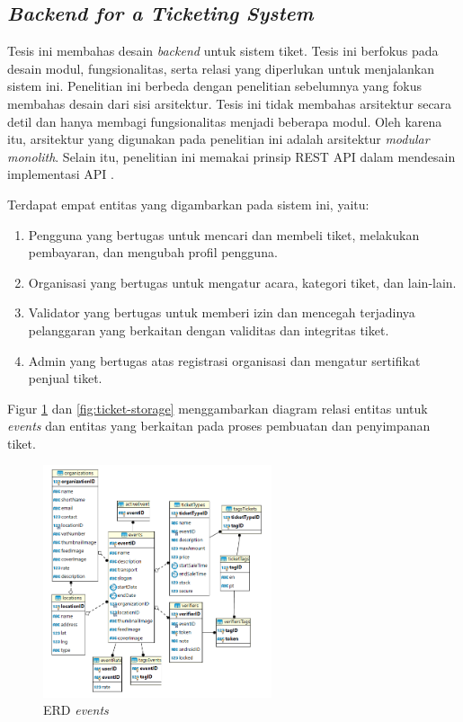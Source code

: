 \subsection{\textit{Backend for a Ticketing System}}

Tesis ini membahas desain \textit{backend} untuk sistem tiket. Tesis ini berfokus pada desain modul, fungsionalitas, serta relasi yang diperlukan untuk menjalankan sistem ini. Penelitian ini berbeda dengan penelitian sebelumnya yang fokus membahas desain dari sisi arsitektur. Tesis ini tidak membahas arsitektur secara detil dan hanya membagi fungsionalitas menjadi beberapa modul. Oleh karena itu, arsitektur yang digunakan pada penelitian ini adalah arsitektur \textit{modular monolith}. Selain itu, penelitian ini memakai prinsip REST API dalam mendesain implementasi API \parencite{backendForTicketing}.

Terdapat empat entitas yang digambarkan pada sistem ini, yaitu:

\begin{enumerate}
    \item Pengguna yang bertugas untuk mencari dan membeli tiket, melakukan pembayaran, dan mengubah profil pengguna.
    \item Organisasi yang bertugas untuk mengatur acara, kategori tiket, dan lain-lain.
    \item Validator yang bertugas untuk memberi izin dan mencegah terjadinya pelanggaran yang berkaitan dengan validitas dan integritas tiket.
    \item Admin yang bertugas atas registrasi organisasi dan mengatur sertifikat penjual tiket.
\end{enumerate}

Figur \ref{fig:event-rm} dan \ref{fig:ticket-storage} menggambarkan diagram relasi entitas untuk \textit{events} dan entitas yang berkaitan pada proses pembuatan dan penyimpanan tiket.

\begin{figure}[ht]
    \centering
    \includegraphics[width=0.6\textwidth]{resources/chapter-2/event-rm.png}
    \caption{ERD \textit{events} \parencite{backendForTicketing}}
    \label{fig:event-rm}
\end{figure}

